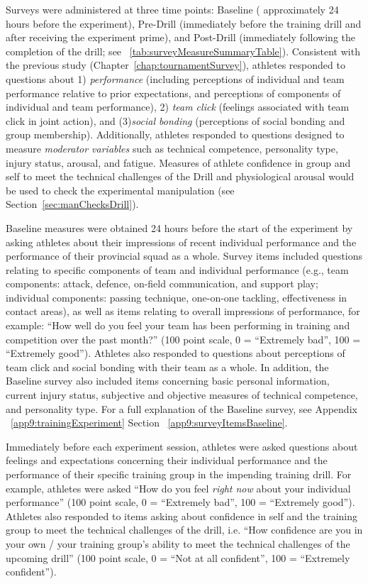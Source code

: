 Surveys were administered at three time points: Baseline ( approximately 24 hours before the experiment), Pre-Drill (immediately before the training drill and after receiving the experiment prime), and Post-Drill (immediately following the completion of the drill; see ~\ref{tab:surveyMeasureSummaryTable}). Consistent with the previous study (Chapter~\ref{chap:tournamentSurvey}), athletes responded to questions about 1) \textit{performance} (including perceptions of individual and team performance relative to prior expectations, and perceptions of components of individual and team performance), 2) \textit{team click} (feelings associated with team click in joint action), and (3)\textit{social bonding} (perceptions of social bonding and group membership).  Additionally, athletes responded to questions designed to measure \textit{moderator variables} such as technical competence, personality type, injury status, arousal, and fatigue. Measures of athlete confidence in group and self to meet the technical challenges of the Drill and physiological arousal would be used to check the experimental manipulation (see Section~\ref{sec:manChecksDrill}).


    


Baseline measures were obtained 24 hours before the start of the experiment by asking athletes about their impressions of recent individual performance and the performance of their provincial squad as a whole.  Survey items included questions relating to specific components of team and individual performance (e.g., team components: attack, defence, on-field communication, and support play; individual components: passing technique, one-on-one tackling, effectiveness in contact areas), as well as items relating to overall impressions of performance, for example: ``How well do you feel your team has been performing in training and competition over the past month?'' (100 point scale, 0 = ``Extremely bad'', 100 = ``Extremely good'').  Athletes also responded to questions about perceptions of team click and social bonding with their team as a whole.  In addition, the Baseline survey also included items concerning basic personal information, current injury status, subjective and objective measures of technical competence, and personality type.  For a full explanation of the Baseline survey, see Appendix ~\ref{app9:trainingExperiment} Section ~\ref{app9:surveyItemsBaseline}.


Immediately before each experiment session, athletes were asked questions about feelings and expectations concerning their individual performance and the performance of their specific training group in the impending training drill.  For example, athletes were asked ``How do you feel \textit{right now} about your individual performance'' (100 point scale, 0 = ``Extremely bad'', 100 = ``Extremely good'').  Athletes also responded to items asking about confidence in self and the training group to meet the technical challenges of the drill, i.e. ``How confidence are you in your own / your training group's ability to meet the technical challenges of the upcoming drill'' (100 point scale, 0 = ``Not at all confident'', 100 = ``Extremely confident'').


